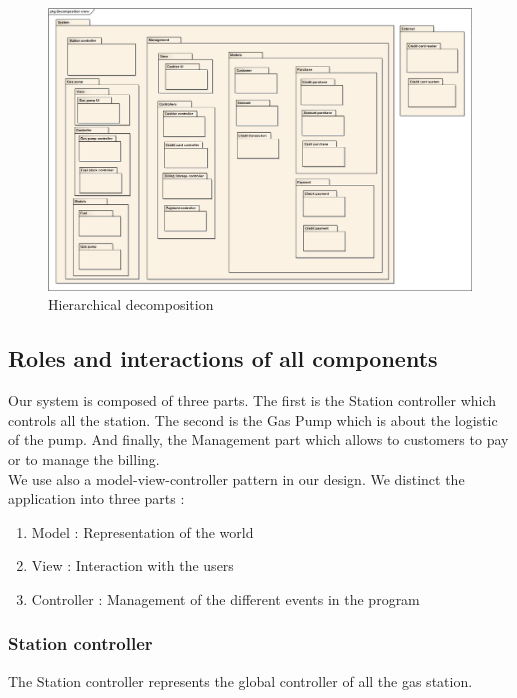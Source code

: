 \documentclass[11pt,a4paper]{article}
\begin{document}
\begin{figure}[H]
 \centering
 \includegraphics[width=\textwidth]{../DecompositionView.png} 
 \caption{Hierarchical decomposition}
 \label{fig:dep}
\end{figure}

\subsection{Roles and interactions of all components}

Our system is composed of three parts. The first is the Station controller which controls all the station. The second is the Gas Pump which is about the logistic of the pump. And finally, the Management part which allows to customers to pay or to manage the billing.\\


We use also a model-view-controller pattern in our design. We distinct the application into three parts :
\begin{enumerate}
\item{Model :} Representation of the world
\item{View :} Interaction with the users
\item{Controller :} Management of the different events in the program
\end{enumerate}

\subsubsection*{Station controller}
The Station controller represents the global controller of all the gas station.
\end{document}
